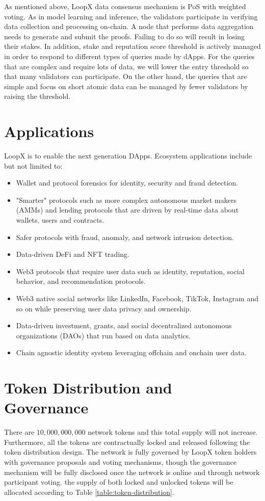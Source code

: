 \documentclass[11pt,letterpaper]{article}
\begin{document}
As mentioned above, LoopX data consensus mechanism is PoS with weighted voting. As in model learning and inference, the validators participate in verifying data collection and processing on-chain. A node that performs data aggregation needs to generate and submit the proofs. Failing to do so will result in losing their stakes. In addition, stake and reputation score threshold is actively managed in order to respond to different types of queries made by dApps. For the queries that are complex and require lots of data, we will lower the entry threshold so that many validators can participate. On the other hand, the queries that are simple and focus on short atomic data can be managed by fewer validators by raising the threshold.

\section{Applications}
LoopX is to enable the next generation DApps. Ecosystem applications include but not limited to:
\begin{itemize}
    \item Wallet and protocol forensics for identity, security and fraud detection.
    \item "Smarter" protocols such as more complex autonomous market makers (AMMs) and lending protocols that are driven by real-time data about wallets, users and contracts.
    \item Safer protocols with fraud, anomaly, and network intrusion detection.
    \item Data-driven DeFi and NFT trading.
    \item Web3 protocols that require user data such as identity, reputation, social behavior, and recommendation protocols.
    \item Web3 native social networks like LinkedIn, Facebook, TikTok, Instagram and so on while preserving user data privacy and ownership.
    \item Data-driven investment, grants, and social decentralized autonomous organizations (DAOs) that run based on data analytics.
    \item Chain agnostic identity system leveraging offchain and onchain user data.
\end{itemize}

\section{Token Distribution and Governance}
There are $10,000,000,000$ network tokens and this total supply will not increase. Furthermore, all the tokens are contractually locked and released following the token
distribution design. The network is fully governed by LoopX token holders with governance proposals and voting mechanisms, though the governance mechanism will be fully disclosed once the network is online and through network participant voting. the supply of both locked and unlocked tokens will be allocated according to Table \ref{table:token-distribution}.
\end{document}
